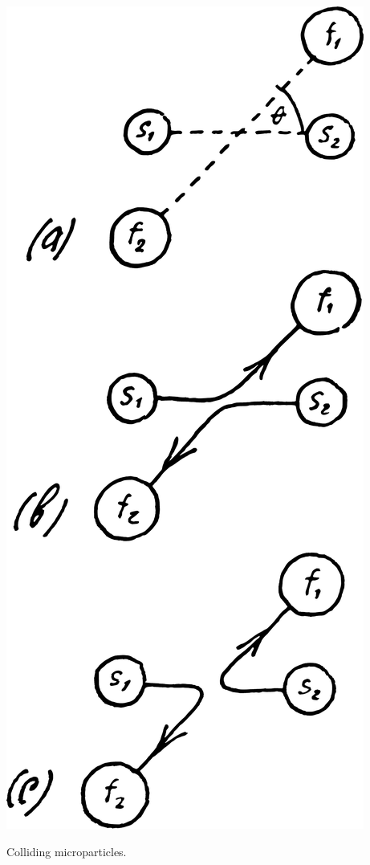 \documentclass[a4paper,sfsidenotes,colorlinks=true]{tufte-book}
\numberwithin{equation}{section}
\numberwithin{figure}{section}
\begin{document}
\begin{marginfigure}[1cm]
\centering
\includegraphics[width=\textwidth]{figures/fig-09-02.pdf}
\caption{Colliding microparticles.}
\label{fig-9.2}
\end{marginfigure}
\end{document}
